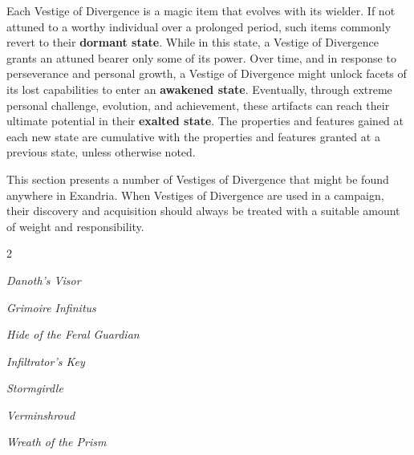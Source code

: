 \documentclass[10pt,a4paper,twoside,bg=print,twocolumn,openany,nodeprecatedcode]{dndbook}
\begin{document}
Each Vestige of Divergence is a magic item that evolves with its wielder. If not attuned to a worthy individual over a prolonged period, such items commonly revert to their \textbf{dormant state}. While in this state, a Vestige of Divergence grants an attuned bearer only some of its power. Over time, and in response to perseverance and personal growth, a Vestige of Divergence might unlock facets of its lost capabilities to enter an \textbf{awakened state}. Eventually, through extreme personal challenge, evolution, and achievement, these artifacts can reach their ultimate potential in their \textbf{exalted state}. The properties and features gained at each new state are cumulative with the properties and features granted at a previous state, unless otherwise noted.

This section presents a number of Vestiges of Divergence that might be found anywhere in Exandria. When Vestiges of Divergence are used in a campaign, their discovery and acquisition should always be treated with a suitable amount of weight and responsibility.


\begin{itemize}
\begin{multicols}{2}
\item \textit{Danoth's Visor}
\item \textit{Grimoire Infinitus}
\item \textit{Hide of the Feral Guardian}
\item \textit{Infiltrator's Key}
\item \textit{Stormgirdle}
\item \textit{Verminshroud}
\item \textit{Wreath of the Prism}
\end{multicols}

\end{itemize}
\end{document}
